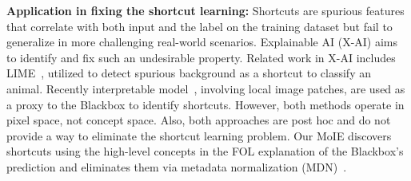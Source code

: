\textbf{Application in fixing the shortcut learning:}
Shortcuts are spurious features that correlate with both input and the label on the training dataset but fail to generalize in more challenging real-world scenarios. Explainable AI (X-AI) aims to identify and fix such an undesirable property. Related work in X-AI includes LIME~\cite{ribeiro2016should}, utilized to detect spurious background as a shortcut to classify an animal. Recently interpretable model~\cite{rosenzweig2021patch}, involving local image patches, are used 
as a proxy to the Blackbox to identify shortcuts. However, both methods operate in pixel space, not concept space. Also, both approaches are post hoc and do not provide a way to eliminate the shortcut 
learning problem. Our MoIE discovers shortcuts using the high-level concepts in the FOL explanation of the Blackbox's prediction and eliminates them via metadata normalization (MDN)~\cite{lu2021metadata}.

